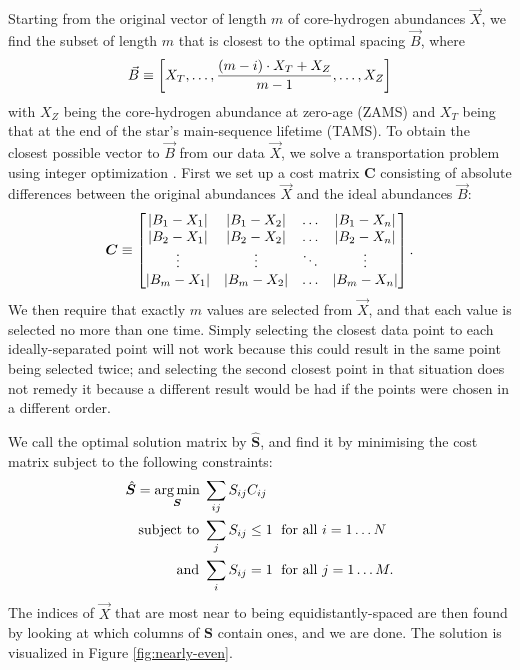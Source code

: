 \documentclass[manuscript]{aastex}
\begin{document}
Starting from the original vector of length $m$ of core-hydrogen abundances $\vec X$, we find the subset of length $m$ that is closest to the optimal spacing $\vec B$, where
\begin{equation}
  \vec B \equiv \qty[
    X_T, 
    \ldots,
    \frac{(m-i)\cdot X_T + X_Z}{m-1}, 
    \ldots, 
    X_Z
  ]
\end{equation}
with $X_Z$ being the core-hydrogen abundance at zero-age (ZAMS) and $X_T$ being that at the end of the star's main-sequence lifetime (TAMS). To obtain the closest possible vector to $\vec B$ from our data $\vec X$, we solve a transportation problem using integer optimization \citep{23145595}. First we set up a cost matrix $\boldsymbol{C}$ consisting of absolute differences between the original abundances $\vec X$ and the ideal abundances $\vec B$:
\begin{equation}
  \boldsymbol C \equiv 
  \begin{bmatrix}
    \abs{B_1-X_1} & \abs{B_1-X_2} & \dots & \abs{B_1-X_n} \\ 
    \abs{B_2-X_1} & \abs{B_2-X_2} & \dots & \abs{B_2-X_n} \\ 
    \vdots & \vdots & \ddots & \vdots\\ 
    \abs{B_m-X_1} & \abs{B_m-X_2} & \dots & \abs{B_m-X_n}
  \end{bmatrix}.
\end{equation}
We then require that exactly $m$ values are selected from $\vec X$, and that each value is selected no more than one time. Simply selecting the closest data point to each ideally-separated point will not work because this could result in the same point being selected twice; and selecting the second closest point in that situation does not remedy it because a different result would be had if the points were chosen in a different order. 

We call the optimal solution matrix by $\hat{\boldsymbol{S}}$, and find it by minimising the cost matrix subject to the following constraints:
\begin{align}
  \hat{\boldsymbol{S}} = \underset{\boldsymbol S}{\arg\min} \; & \sum_{ij} S_{ij} C_{ij} \notag\\
  \text{subject to } & \sum_j S_{ij} \leq 1 \; \text{ for all } i=1\ldots N \notag\\
  \text{and } & \sum_i S_{ij} = 1 \; \text{ for all } j=1\ldots M.
  \label{eq:optimal-spacing}
\end{align}
The indices of $\vec X$ that are most near to being equidistantly-spaced are then found by looking at which columns of $\boldsymbol S$ contain ones, and we are done. The solution is visualized in Figure \ref{fig:nearly-even}.
\end{document}

